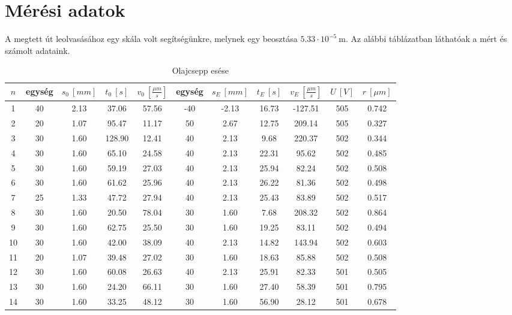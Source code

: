 \documentclass[a4paper]{article}
\begin{document}
\section{Mérési adatok}
A megtett út leolvasásához egy skála volt segítségünkre, melynek egy beosztása $5.33\cdot10^{-5}\ \text{m}$.
Az alábbi táblázatban láthatóak a mért és számolt adataink.
\begin{table}[h!]\centering
	\caption{Olajcsepp esése}
	\vspace{0.3cm}
	\begin{tabular}{|c|c|c|c|c|c|c|c|c|c|c|}
		
		\hline
		$n$ & egység & $s_0\ [mm]$ & $t_0\ [s]$ & $v_0\ \left[\frac{\mu m}{s}\right]$ & egység & $s_E\ [mm]$ & $t_E\ [s]$ & $v_E\ \left[\frac{\mu m}{s}\right]$ & $U\ [V]$ & $r\ [\mu m]$ \\ \hline
		1 & 40 & 2.13 & 37.06 & 57.56 & -40 & -2.13 & 16.73 & -127.51 & 505 & 0.742 \\ \hline
		2 & 20 & 1.07 & 95.47 & 11.17 & 50 & 2.67 & 12.75 & 209.14 & 505 & 0.327 \\ \hline
		3 & 30 & 1.60 & 128.90 & 12.41 & 40 & 2.13 & 9.68 & 220.37 & 502 & 0.344 \\ \hline
		4 & 30 & 1.60 & 65.10 & 24.58 & 40 & 2.13 & 22.31 & 95.62 & 502 & 0.485 \\ \hline
		5 & 30 & 1.60 & 59.19 & 27.03 & 40 & 2.13 & 25.94 & 82.24 & 502 & 0.508 \\ \hline
		6 & 30 & 1.60 & 61.62 & 25.96 & 40 & 2.13 & 26.22 & 81.36 & 502 & 0.498 \\ \hline
		7 & 25 & 1.33 & 47.72 & 27.94 & 40 & 2.13 & 25.43 & 83.89 & 502 & 0.517 \\ \hline
		8 & 30 & 1.60 & 20.50 & 78.04 & 30 & 1.60 & 7.68 & 208.32 & 502 & 0.864 \\ \hline
		9 & 30 & 1.60 & 62.75 & 25.50 & 30 & 1.60 & 19.25 & 83.11 & 502 & 0.494 \\ \hline
		10 & 30 & 1.60 & 42.00 & 38.09 & 40 & 2.13 & 14.82 & 143.94 & 502 & 0.603 \\ \hline
		11 & 20 & 1.07 & 39.48 & 27.02 & 30 & 1.60 & 18.63 & 85.88 & 502 & 0.508 \\ \hline
		12 & 30 & 1.60 & 60.08 & 26.63 & 40 & 2.13 & 25.91 & 82.33 & 501 & 0.505 \\ \hline
		13 & 30 & 1.60 & 24.20 & 66.11 & 30 & 1.60 & 27.40 & 58.39 & 501 & 0.795 \\ \hline
		14 & 30 & 1.60 & 33.25 & 48.12 & 30 & 1.60 & 56.90 & 28.12 & 501 & 0.678 \\ \hline

\end{tabular}
\end{table}
\end{document}
